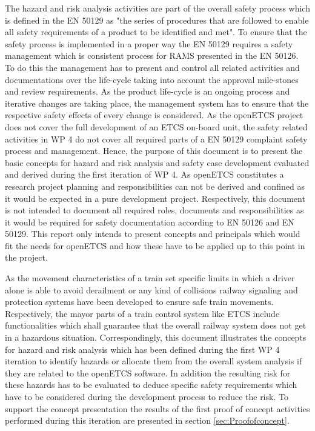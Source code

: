 \documentclass{template/openetcs_report}
\begin{document}
The hazard and risk analysis activities are part of the overall safety process which is defined in the EN 50129 as "the series of procedures that are followed to enable all safety requirements of a product to be identified and met". To ensure that the safety process is implemented in a proper way the EN 50129 requires a safety management which is consistent process for RAMS presented in the EN 50126. To do this the management has to present and control all related activities and documentations over the life-cycle taking into account the approval mile-stones and review requirements. As the product life-cycle is an ongoing process and iterative changes are taking place, the management system has to ensure that the respective safety effects of every change is considered. As the openETCS project does not cover the full development of an ETCS on-board unit, the safety related activities in WP 4 do not cover all required parts of a EN 50129 complaint safety process and management. Hence, the purpose of this document is to present the basic concepts for hazard and risk analysis and safety case development evaluated and derived during the first iteration of WP 4. As openETCS constitutes a research project planning and responsibilities can not be derived and confined as it would be expected in a pure development project. Respectively, this document is not intended to document all required roles, documents and responsibilities as it would be required for safety documentation according to EN 50126 and EN 50129. This report only intends to present concepts and principals which would fit the needs for openETCS and how these have to be applied up to this point in the project.

As the movement characteristics of a train set specific limits in which a driver alone is able to avoid derailment or any kind of collisions railway signaling and protection systems have been developed to ensure safe train movements. Respectively, the mayor parts of a train control system like ETCS include functionalities which shall guarantee that the overall railway system does not get in a hazardous situation. Correspondingly, this document illustrates the concepts for hazard and risk analysis which has been defined during the first WP 4 iteration to identify hazards or allocate them from the overall system analysis if they are related to the openETCS software. In addition the resulting risk for these hazards has to be evaluated to deduce specific safety requirements which have to be considered during the development process to reduce the risk. To support the concept presentation the results of the first proof of concept activities performed during this iteration are presented in section \ref{sec:Proofofconcept}.
\end{document}
